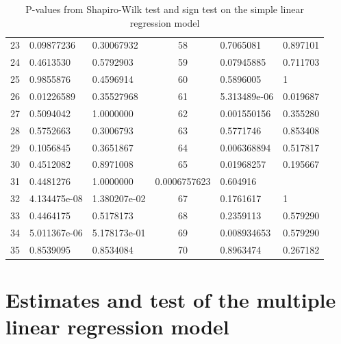 \begin{table}[H]
\begin{tabular}{c:ll|c:ll}
        23 & 0.09877236 & 0.30067932 & 58 & 0.7065081 & 0.897101\\ 
        24 & 0.4613530 & 0.5792903 & 59 & 0.07945885 & 0.711703 \\ 
        25 & 0.9855876 & 0.4596914 & 60 &  0.5896005 & 1\\ 
        26 & 0.01226589 & 0.35527968 & 61 & 5.313489e-06 & 0.019687\\
        27 & 0.5094042 & 1.0000000 & 62 & 0.001550156 & 0.355280\\ 
        28 & 0.5752663 & 0.3006793 & 63 & 0.5771746 & 0.853408\\ 
        29 & 0.1056845 & 0.3651867 & 64 & 0.006368894 & 0.517817\\ 
        30 & 0.4512082 & 0.8971008 & 65 & 0.01968257 & 0.195667\\ 
        31 & 0.4481276 & 1.0000000 & 0.0006757623 & 0.604916\\ 
        32 & 4.134475e-08 & 1.380207e-02 & 67 & 0.1761617 & 1\\ 
        33 & 0.4464175 & 0.5178173 & 68 & 0.2359113 & 0.579290\\ 
        34 & 5.011367e-06 & 5.178173e-01 & 69 & 0.008934653 &0.579290 \\ 
        35 & 0.8539095 & 0.8534084 & 70 & 0.8963474 & 0.267182\\
        \hline
    \end{tabular}
    \caption{P-values from Shapiro-Wilk test and sign test on the simple linear regression model}
    \label{tab: shapiro_simple_lm}
\end{table}

\section{Estimates and test of the multiple linear regression model}

